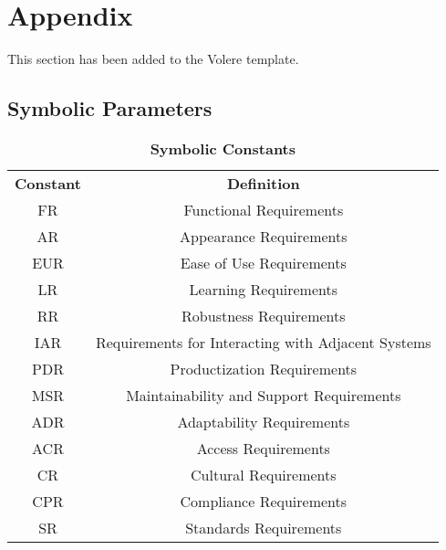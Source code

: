 \documentclass[12pt, titlepage]{article}
\begin{document}




\newpage

\section{Appendix}

This section has been added to the Volere template.

\subsection{Symbolic Parameters}

\begin{table}[ht]
\caption{\bf Symbolic Constants}
\centering
\begin{tabular}{ |c|c| } 
 \hline
 \textbf{Constant} & \textbf{Definition}\\ 
FR & Functional Requirements\\
AR & Appearance Requirements\\
EUR & Ease of Use Requirements\\
LR & Learning Requirements\\
RR & Robustness Requirements\\
IAR & Requirements for Interacting with Adjacent Systems\\
PDR & Productization Requirements\\
MSR & Maintainability and Support Requirements\\
ADR & Adaptability Requirements\\
ACR & Access Requirements\\
CR & Cultural Requirements\\
CPR & Compliance Requirements\\
SR & Standards Requirements\\
 \hline
\end{tabular}
\end{table}
\end{document}
